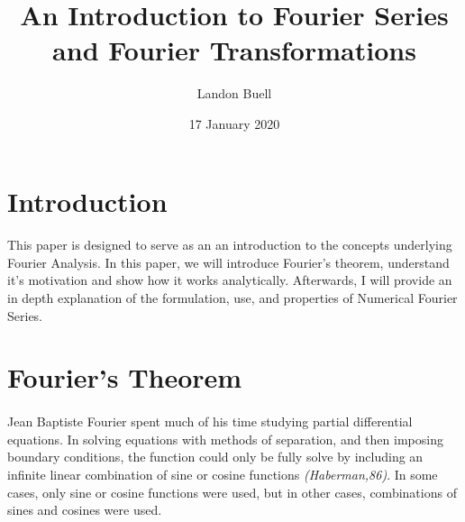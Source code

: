\documentclass[12pt,letterpaper]{article}
\begin{document}

\title{An Introduction to Fourier Series and Fourier Transformations}
\author{Landon Buell}
\date{17 January 2020}
\maketitle


\section{Introduction}

\paragraph*{}This paper is designed to serve as an an introduction to the concepts underlying Fourier Analysis. In this paper, we will introduce Fourier's theorem, understand it's motivation and show how it works analytically. Afterwards, I will provide an in depth explanation of the formulation, use, and properties of Numerical Fourier Series. 


\section{Fourier's Theorem}

\paragraph*{}Jean Baptiste Fourier spent much of his time studying partial differential equations. In solving equations with methods of separation, and then imposing boundary conditions, the function could only be fully solve by including an infinite linear combination of sine or cosine functions \textit{(Haberman,86)}. In some cases, only sine or cosine functions were used, but in other cases, combinations of sines and cosines were used. 
\end{document}
